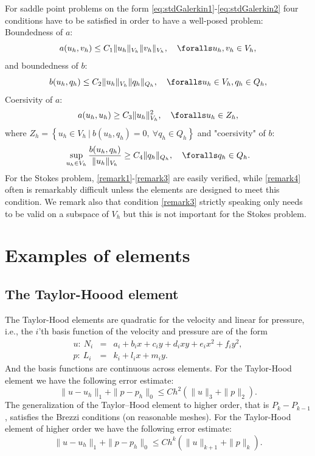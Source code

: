 \begin{remark}
For saddle point problems on the form \eqref{eq:stdGalerkin1}-\eqref{eq:stdGalerkin2} four conditions
have to be satisfied in order to have a well-posed problem: \\
Boundedness of $a$:
\begin{equation}
\label{remark1}
a(u_h, v_h) \le C_1 \|u_h\|_{V_h} \|v_h\|_{V_h}, \quad \foralls u_h, v_h \in V_h,
\end{equation}
and boundedness of $b$:
\begin{equation}
\label{remark2}
b(u_h, q_h) \le C_2 \|u_h\|_{V_h} \|q_h\|_{Q_h},  \quad \foralls u_h \in V_h,  q_h \in Q_h,
\end{equation}
Coersivity of $a$:
\begin{equation}
\label{remark3}
a(u_h, u_h) \ge C_3 \|u_h\|^2_{V_h} , \quad \foralls u_h \in Z_h,
\end{equation}
where $Z_h=\left\{u_h \in V_h \ | \ b(u_h, q_h) = 0, \  \forall q_h\in Q_h\right\}$ and "coersivity" of $b$:
\begin{equation}
\label{remark4}
\sup_{u_h\in V_h} \frac{b(u_h, q_h)}{\|u_h\|_{V_h}} \ge C_4 \|q_h\|_{Q_h} , \quad \foralls q_h \in Q_h.
\end{equation}
For the Stokes problem, \eqref{remark1}-\eqref{remark3} are easily verified, while \eqref{remark4} often
is remarkably difficult unless the elements are designed to meet this condition.
We remark also that condition \eqref{remark3} strictly speaking only needs to be valid on a subspace of $V_h$
but this is not important for the Stokes problem. 
\end{remark}



\section{Examples of elements}
\subsection{The Taylor-Hoood element}
The Taylor-Hood elements are quadratic for the velocity and linear for pressure, i.e., 
the $i$'th basis function of the velocity and pressure are of the form
\begin{eqnarray*}
u:\ N_i &=& a_i + b_i x + c_i y + d_i xy + e_i x^2 + f_i y^2, \\
p:\ L_i &=& k_i + l_i x + m_i y.
\end{eqnarray*}
And the basis functions are continuous across elements.
For the Taylor-Hood element we have the following error estimate:
\[\|u-u_h\|_1 + \|p-p_h\|_0 \leqslant Ch^2 (\|u\|_{3} + \|p\|_{2}).\]
The generalization of the Taylor--Hood element to higher order, that is 
$P_k-P_{k-1}$, satisfies the Brezzi conditions (on reasonable meshes). 
For the Taylor-Hood element of higher order we have the following error estimate:
\[\|u-u_h\|_1 + \|p-p_h\|_0 \leqslant Ch^k (\|u\|_{k+1} + \|p\|_{k}).\]


